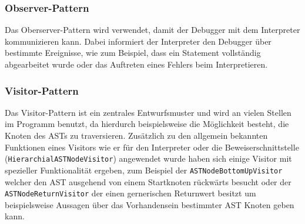 \subsubsection{Observer-Pattern}
Das Oberserver-Pattern wird verwendet, damit der Debugger mit dem Interpreter kommunizieren kann. Dabei informiert der Interpreter den Debugger über bestimmte Ereignisse, wie zum Beispiel, dass ein Statement vollständig abgearbeitet wurde oder das Auftreten eines Fehlers beim Interpretieren. 

\subsubsection{Visitor-Pattern}
Das Visitor-Pattern ist ein zentrales Entwurfsmuster und wird an vielen Stellen im Programm benutzt, da hierdurch beispielsweise die Möglichkeit besteht, die Knoten des ASTs zu traversieren. Zusätzlich zu den allgemein bekannten Funktionen eines Visitors wie er für den Interpreter oder die Beweiserschnittstelle \\(\texttt{HierarchialASTNodeVisitor}) angewendet wurde haben sich einige Visitor mit spezieller Funktionalität ergeben, zum Beispiel der \texttt{ASTNodeBottomUpVisitor} welcher den AST ausgehend von einem Startknoten rückwärts besucht oder der \texttt{ASTNodeReturnVisitor} der einen gernerischen Returnwert besitzt um beispielsweise Aussagen über das Vorhandensein bestimmter AST Knoten geben kann.
